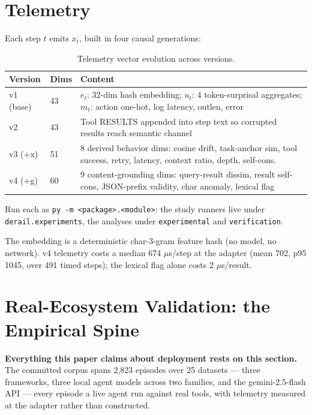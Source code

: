 \documentclass{article}
\begin{document}
\section{Telemetry}

Each step $t$ emits $x_t$, built in four causal generations:

\begin{table}[htbp]
\centering
\caption{Telemetry vector evolution across versions.}
\label{tab:telemetry}
\begin{tabular}{lp{1cm}p{9.4cm}}
\toprule
Version & Dims & Content \\
\midrule
v1 (base) & 43 & $e_t$: 32-dim hash embedding; $u_t$: 4 token-surprisal aggregates; $m_t$: action one-hot, log latency, outlen, error \\
v2 & 43 & Tool RESULTS appended into step text so corrupted results reach semantic channel \\
v3 (+x) & 51 & 8 derived behavior dims: cosine drift, task-anchor sim, tool success, retry, latency, context ratio, depth, self-cons. \\
v4 (+g) & 60 & 9 content-grounding dims: query-result dissim, result self-cons, JSON-prefix validity, char anomaly, lexical flag \\
\bottomrule
\end{tabular}

\vspace{0.4em}
{\footnotesize Run each as \texttt{py -m <package>.<module>}: the study runners live under \texttt{derail.experiments}, the analyses under \texttt{experimental} and \texttt{verification}.}
\end{table}

The embedding is a deterministic char-3-gram feature hash (no model, no network). v4 telemetry costs a median 674 $\mu$s/step at the adapter (mean 702, p95 1045, over 491 timed steps); the lexical flag alone costs 2 $\mu$s/result.

\section{Real-Ecosystem Validation: the Empirical Spine}
\label{sec:real}

\textbf{Everything this paper claims about deployment rests on this section.} The committed corpus spans 2,823 episodes over 25 datasets --- three frameworks, three local agent models across two families, and the gemini-2.5-flash API --- every episode a live agent run against real tools, with telemetry measured at the adapter rather than constructed.
\end{document}
